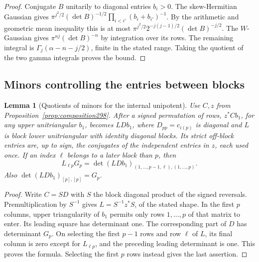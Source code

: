 \documentclass[a4paper,11pt]{article}
\newtheorem{lemma}[proposition]{Lemma}
\theoremstyle{definition}
\theoremstyle{remark}
\numberwithin{equation}{section}
\begin{document}
\begin{proof}
Conjugate \(B\) unitarily to diagonal entries \(b_i>0\).
The skew-Hermitian Gaussian gives
\(\pi^{j^2/2}(\det B)^{-1/2}
\prod_{i<i'}(b_i+b_{i'})^{-1}\). By the arithmetic and
geometric mean inequality this is at most
\(\pi^{j^2/2}2^{-j(j-1)/2}(\det B)^{-j/2}\).
The \(W\)-Gaussian gives \(\pi^{nj}(\det B)^{-n}\)
by integration over its rows. The remaining integral is
\(\Gamma_j(\alpha-n-j/2)\), finite in the stated range.
Taking the quotient of the two gamma integrals proves
the bound.
\end{proof}

\subsection{Minors controlling the entries between blocks}\label{nav:III-62}
\begin{lemma}[Quotients of minors for the internal unipotent]\leavevmode
\label{lem:pivots298}
Use \(C,z\) from Proposition~\ref{prop:composition298}.
After a signed permutation of rows, \(z^*C b_1\), for any
upper unitriangular \(b_1\), becomes \(L D b_1\), where
\(D_{pp}=c_{i(p)}\) is diagonal and \(L\) is block lower
unitriangular with identity diagonal blocks. Its strict
off-block entries are, up to sign, the conjugates of the
independent entries in \(z\), each used once. If an index
\(\ell\) belongs to a later block than \(p\), then
\[
  L_{\ell p}G_p=
   \det (LDb_1)_{(1,\ldots,p-1,\ell),(1,\ldots,p)} .
\]
Also \(\det (LDb_1)_{[p],[p]}=G_p\).
\end{lemma}
\begin{proof}
Write \(C=S D\) with \(S\) the block diagonal product of
the signed reversals. Premultiplication by \(S^{-1}\)
gives \(L=S^{-1}z^*S\), of the stated shape. In the first
\(p\) columns, upper triangularity of \(b_1\) permits only
rows \(1,\ldots,p\) of that matrix to enter. Its leading
square has determinant one. The corresponding part of \(D\)
has determinant \(G_p\). On selecting the first \(p-1\)
rows and row \(\ell\) of \(L\), its final column is zero
except for \(L_{\ell p}\), and the preceding leading
determinant is one. This proves the formula. Selecting the
first \(p\) rows instead gives the last assertion.
\end{proof}
\end{document}
